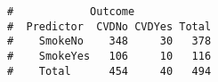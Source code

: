 \documentclass[letterpaper,12pt,twoside,]{pinp}
\begin{document}
\begin{Shaded}
\begin{Highlighting}[]
\OperatorTok{$}\OperatorTok{$}\OperatorTok{$}
\end{Highlighting}
\end{Shaded}

\begin{ShadedResult}
\begin{verbatim}
#            Outcome
#  Predictor  CVDNo CVDYes Total
#    SmokeNo    348     30   378
#    SmokeYes   106     10   116
#    Total      454     40   494
\end{verbatim}
\end{ShadedResult}





\end{document}
